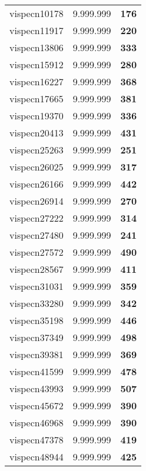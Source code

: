 \begin{tabular}{cc||c}
vispecn10178     & 9.999.999        & {\bf 176}       \\ 
vispecn11917     & 9.999.999        & {\bf 220}       \\ 
vispecn13806     & 9.999.999        & {\bf 333}       \\ 
vispecn15912     & 9.999.999        & {\bf 280}       \\ 
vispecn16227     & 9.999.999        & {\bf 368}       \\ 
vispecn17665     & 9.999.999        & {\bf 381}       \\ 
vispecn19370     & 9.999.999        & {\bf 336}       \\ 
vispecn20413     & 9.999.999        & {\bf 431}       \\ 
vispecn25263     & 9.999.999        & {\bf 251}       \\ 
vispecn26025     & 9.999.999        & {\bf 317}       \\ 
vispecn26166     & 9.999.999        & {\bf 442}       \\ 
vispecn26914     & 9.999.999        & {\bf 270}       \\ 
vispecn27222     & 9.999.999        & {\bf 314}       \\ 
vispecn27480     & 9.999.999        & {\bf 241}       \\ 
vispecn27572     & 9.999.999        & {\bf 490}       \\ 
vispecn28567     & 9.999.999        & {\bf 411}       \\ 
vispecn31031     & 9.999.999        & {\bf 359}       \\ 
vispecn33280     & 9.999.999        & {\bf 342}       \\ 
vispecn35198     & 9.999.999        & {\bf 446}       \\ 
vispecn37349     & 9.999.999        & {\bf 498}       \\ 
vispecn39381     & 9.999.999        & {\bf 369}       \\ 
vispecn41599     & 9.999.999        & {\bf 478}       \\ 
vispecn43993     & 9.999.999        & {\bf 507}       \\ 
vispecn45672     & 9.999.999        & {\bf 390}       \\ 
vispecn46968     & 9.999.999        & {\bf 390}       \\ 
vispecn47378     & 9.999.999        & {\bf 419}       \\ 
vispecn48944     & 9.999.999        & {\bf 425}       \\ 

\end{tabular}
